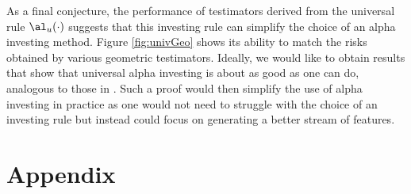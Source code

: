 \documentclass{gSCS2e}
\begin{document}
 As a final conjecture, the performance of testimators derived from the
 universal rule $\al_u(\cdot)$ suggests that this investing rule can simplify
 the choice of an alpha investing method.  Figure \ref{fig:univGeo} shows its
 ability to match the risks obtained by various geometric testimators.  Ideally,
 we would like to obtain results that show that universal alpha investing is about
 as good as one can do, analogous to those in \citet{rissanen83}.  Such a proof would
 then simplify the use of alpha investing in practice as one would not need to
 struggle with the choice of an investing rule but instead could focus on
 generating a better stream of features.


\section*{Appendix}
\end{document}
